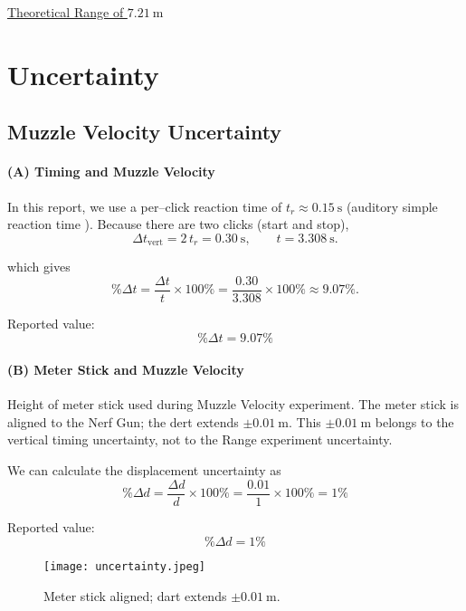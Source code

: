 \documentclass[12pt]{article}
\begin{document}
\vspace{1em}

\noindent\hfill\underline{Theoretical Range of $7.21~\mathrm{m}$}

\newpage
\section{Uncertainty}
\subsection{Muzzle Velocity Uncertainty}
\paragraph{(A) Timing and Muzzle Velocity}
In this report, we use a per–click reaction time of $t_r \approx 0.15~\mathrm{s}$ (auditory simple reaction time \cite{Kosinski2008}).
Because there are two clicks (start and stop),
\[
\Delta t_{\text{vert}} = 2\,t_r = 0.30~\mathrm{s}, \qquad t=3.308~\mathrm{s}.
\]

which gives
\[
\%\Delta t = \frac{\Delta t}{t} \times 100\%
= \frac{0.30}{3.308}\times 100\%\approx 9.07\%.
\]

Reported value:
\vspace{1em}
\[
\%\Delta t = 9.07\%
\]

\vspace{1em}


\paragraph{(B) Meter Stick and Muzzle Velocity}

Height of meter stick used during Muzzle Velocity experiment. The meter stick is aligned to the Nerf Gun; the dert extends $\pm 0.01~\mathrm{m}$. 
This $\pm 0.01~\mathrm{m}$ belongs to the vertical timing uncertainty, not to the Range experiment uncertainty.

We can calculate the displacement uncertainty as
\[
\%\Delta d=\frac{\Delta d}{d} \times 100\%=\frac{0.01}{1}\times 100\%=1\%
\]

Reported value: 
\[
\%\Delta d=1\%
\]

\begin{figure}[H]
  \centering
  \texttt{[image: uncertainty.jpeg]}
  \caption*{Meter stick aligned; dart extends $\pm 0.01~\mathrm{m}$.}
\end{figure}
\end{document}
